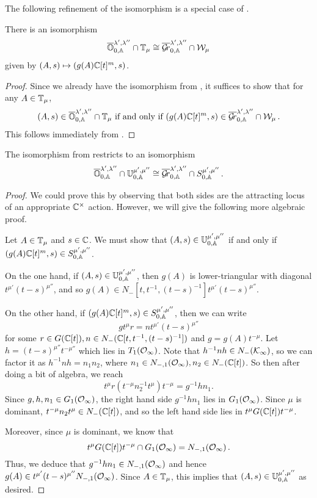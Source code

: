 \documentclass{article}
\begin{document}
The following refinement of the \mvy isomorphism is a special case of \cite[Theorem 5.3]{mirkovic2007quiver}. 
% 
\begin{theorem}\label{th:OGrl}
There is an isomorphism
$$
    \overline{\mathbb O}^{\lambda', \lambda''}_{0,\mathbb A} \cap \mathbb T_\mu \cong \overline{\mathcal{G}\!r}^{\lambda', \lambda''}_{0,\mathbb A} \cap \mathcal W_\mu 
$$
given by $ (A,s) \mapsto (g(A)\mathbb C[t]^m, s)$.
\end{theorem}
% 
\begin{proof}
Since we already have the isomorphism from , it suffices to show that for any $ A \in \mathbb T_\mu$, 
$$ 
    (A,s) \in \overline{\mathbb O}^{\lambda', \lambda''}_{0,\mathbb A} \cap \mathbb T_\mu \text{ if and only if } (g(A)\mathbb C[t]^m, s) \in \overline{\mathcal{G}\!r}^{\lambda', \lambda''}_{0,\mathbb A} \cap \mathcal W_\mu \,. 
$$
This follows immediately from .
\end{proof}
% 
\begin{theorem}\label{th:OTGrW}
The isomorphism from  restricts to an isomorphism
$$ 
    \overline{\mathbb O}^{\lambda', \lambda''}_{0,\mathbb A} \cap \mathbb U^{\mu', \mu''}_{0,\mathbb A} \cong \overline{\mathcal{G}\!r}^{\lambda', \lambda''}_{0,\mathbb A} \cap S^{\mu', \mu''}_{0,\mathbb A}\,.
$$
\end{theorem}
% 
\begin{proof}
We could prove this by observing that both sides are the attracting locus of an appropriate $ {\mathbb C^\times}$ action. However, we will give the following more algebraic proof.

Let $ A \in \mathbb T_\mu$ and $ s \in \mathbb C $. We must show that  $ (A,s) \in \mathbb U^{\mu', \mu''}_{0,\mathbb A} $ if and only if $ (g(A)\mathbb C[t]^m,s) \in S^{\mu', \mu''}_{0,\mathbb A} $. 

On the one hand, if $ (A,s) \in \mathbb U^{\mu', \mu''}_{0,\mathbb A} $, then $ g(A)$ is lower-triangular with diagonal $ t^{\mu'} (t-s)^{\mu''}$, and so $ g(A) \in N_-[t, t^{-1}, (t-s)^{-1}] t^{\mu'} (t-s)^{\mu''}$. 

On the other hand, if $ (g(A)\mathbb C[t]^m, s) \in S^{\mu', \mu''}_{0,\mathbb A}$, then we can write 
$$
    g t^\mu r= n t^{\mu'} (t-s)^{\mu''}
$$
for some $ r \in G(\mathbb C[t]), n \in N_-(\mathbb C[t, t^{-1}, (t-s)^{-1}]) $ and $ g = g(A)t^{-\mu}$.  Let $ h = (t-s)^{\mu''} t^{-\mu''}$ which lies in $ T_1(\mathcal O_\infty) $. 
Note that $ h^{-1}n h \in N_-(\mathcal K_\infty)$, so we can factor it as $ h^{-1} n h  = n_1 n_2 $, where $ n_1 \in N_{-,1}(\mathcal O_\infty), n_2 \in N_-(\mathbb C[t])$.  So then after doing a bit of algebra, we reach
$$
    t^\mu r (t^{-\mu} n_2^{-1} t^\mu) t^{-\mu} = g^{-1} h n_1.
$$
Since $ g, h, n_1 \in G_1(\mathcal O_\infty)$, the right hand side $ g^{-1} h n_1 $ lies in $ G_1(\mathcal O_\infty) $.  Since $ \mu $ is dominant, $ t^{-\mu} n_2 t^\mu \in N_-(\mathbb C[t])$, and so the left hand side lies in $t^\mu G(\mathbb C[t]) t^{-\mu}$.

Moreover, since $ \mu $ is dominant, we know that 
$$
    t^\mu G(\mathbb C[t]) t^{-\mu} \cap G_1(\mathcal O_\infty) = N_{-,1}(\mathcal O_\infty)\,.
$$
Thus, we deduce that $ g^{-1} h n_1 \in N_{-,1}(\mathcal O_\infty)$ and hence $ g(A) \in t^{\mu'} (t-s)^{\mu''}N_{-,1}(\mathcal O_\infty) $. Since $ A \in \mathbb T_\mu $, this implies that $ (A,s) \in \mathbb U^{\mu', \mu''}_{0,\mathbb A}$ as desired.
\end{proof}
\end{document}
